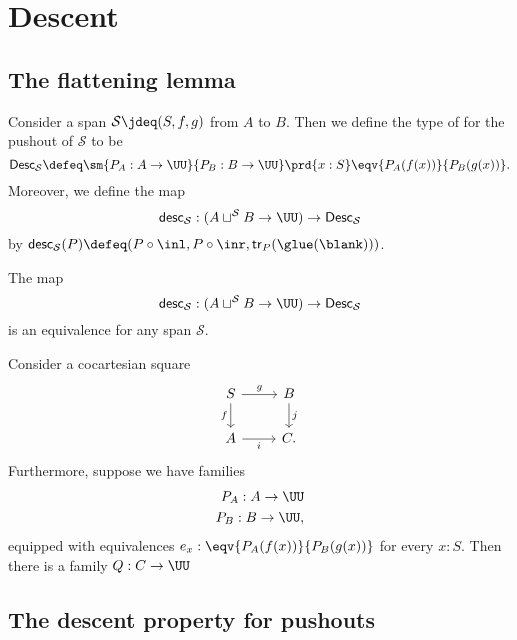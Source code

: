 \chapter{Descent}\label{chap:descent}

\section{The flattening lemma}

\begin{defn}
Consider a span $\mathcal{S}\jdeq (S,f,g)$ from $A$ to $B$. Then we define the type of  for the pushout of $\mathcal{S}$ to be
\begin{equation*}
\mathsf{Desc}_{\mathcal{S}} \defeq \sm{P_A : A\to \UU}{P_B : B\to \UU}\prd{x:S}\eqv{P_A(f(x))}{P_B(g(x))}.
\end{equation*}
Moreover, we define the map
\begin{equation*}
\mathsf{desc}_{\mathcal{S}} : (A \sqcup^{\mathcal{S}} B \to \UU) \to \mathsf{Desc}_{\mathcal{S}}
\end{equation*}
by $\mathsf{desc}_{\mathcal{S}}(P)\defeq (P\circ\inl,P\circ\inr,\mathsf{tr}_P(\glue(\blank)))$.
\end{defn}

\begin{thm}
The map
\begin{equation*}
\mathsf{desc}_{\mathcal{S}} : (A \sqcup^{\mathcal{S}} B \to \UU) \to \mathsf{Desc}_{\mathcal{S}}
\end{equation*}
is an equivalence for any span $\mathcal{S}$.
\end{thm}

\begin{thm}
Consider a cocartesian square
\begin{equation*}
\begin{tikzcd}
S \arrow[r,"g"] \arrow[d,swap,"f"] & B \arrow[d,"j"] \\
A \arrow[r,swap,"i"] & C.
\end{tikzcd}
\end{equation*}
Furthermore, suppose we have families
\begin{align*}
P_A : A \to \UU \\
P_B : B \to \UU,
\end{align*}
equipped with equivalences $e_x : \eqv{P_A(f(x))}{P_B(g(x))}$ for every $x:S$.
Then there is a family $Q:C\to \UU$
\end{thm}

\section{The descent property for pushouts}

